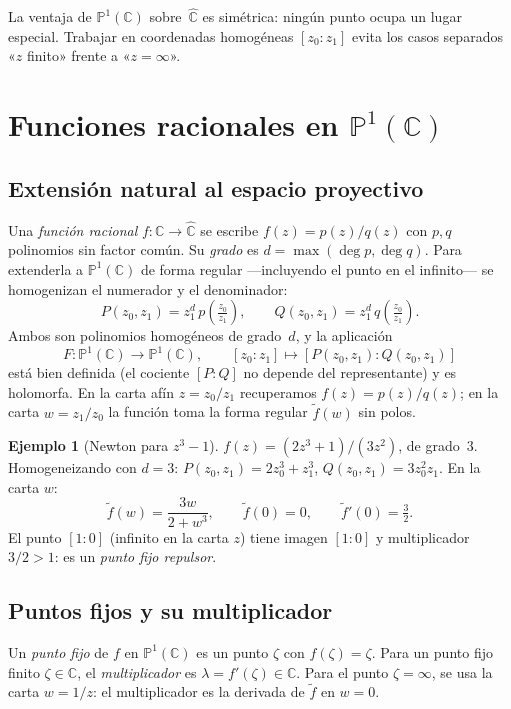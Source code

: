 \documentclass[11pt,a4paper]{article}
\theoremstyle{plain}
\theoremstyle{definition}
\newtheorem{ejemplo}[teorema]{Ejemplo}
\theoremstyle{remark}
\newcommand{\C}{\mathbb{C}}
\newcommand{\Puno}{\mathbb{P}^1(\mathbb{C})}
\begin{document}
La ventaja de $\Puno$ sobre~$\hat{\C}$ es simétrica: ningún punto
ocupa un lugar especial.
Trabajar en coordenadas homogéneas $[z_0:z_1]$ evita los casos
separados «$z$ finito» frente a «$z=\infty$».

\section{Funciones racionales en \texorpdfstring{$\Puno$}{P1(C)}}
\label{sec:racionales}

\subsection{Extensión natural al espacio proyectivo}

Una \emph{función racional} $f:\C\to\hat{\C}$ se escribe
$f(z)=p(z)/q(z)$ con $p,q$ polinomios sin factor común.
Su \emph{grado} es $d=\max(\deg p,\deg q)$.
Para extenderla a $\Puno$ de forma regular —incluyendo el punto en el
infinito— se homogenizan el numerador y el denominador:
\[
  P(z_0,z_1) = z_1^d\,p\!\left(\tfrac{z_0}{z_1}\right),\qquad
  Q(z_0,z_1) = z_1^d\,q\!\left(\tfrac{z_0}{z_1}\right).
\]
Ambos son polinomios homogéneos de grado~$d$, y la aplicación
\[
  F:\Puno\longrightarrow\Puno,\qquad
  [z_0:z_1]\longmapsto [P(z_0,z_1):Q(z_0,z_1)]
\]
está bien definida (el cociente $[P:\!Q]$ no depende del representante)
y es holomorfa.
En la carta afín $z=z_0/z_1$ recuperamos $f(z)=p(z)/q(z)$; en la carta
$w=z_1/z_0$ la función toma la forma regular $\tilde{f}(w)$ sin polos.

\begin{ejemplo}[Newton para $z^3-1$]
$f(z)=(2z^3+1)/(3z^2)$, de grado~$3$.
Homogeneizando con $d=3$:
$P(z_0,z_1)=2z_0^3+z_1^3$,\; $Q(z_0,z_1)=3z_0^2 z_1$.
En la carta $w$:
\[
   \tilde{f}(w) = \frac{3w}{2+w^3},\qquad\tilde{f}(0)=0,\qquad
   \tilde{f}'(0)=\tfrac{3}{2}.
\]
El punto $[1:0]$ (infinito en la carta $z$) tiene imagen $[1:0]$ y
multiplicador~$3/2>1$: es un \emph{punto fijo repulsor}.
\end{ejemplo}

\subsection{Puntos fijos y su multiplicador}

Un \emph{punto fijo} de $f$ en $\Puno$ es un punto $\zeta$ con
$f(\zeta)=\zeta$.
Para un punto fijo finito $\zeta\in\C$, el \emph{multiplicador} es
$\lambda=f'(\zeta)\in\C$.
Para el punto $\zeta=\infty$, se usa la carta $w=1/z$: el multiplicador
es la derivada de $\tilde{f}$ en $w=0$.
\end{document}
